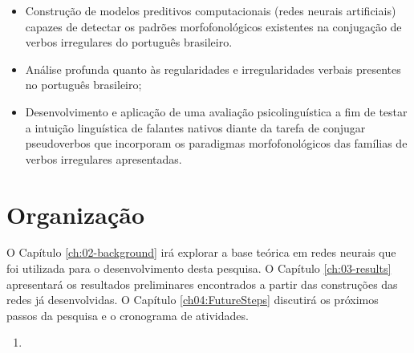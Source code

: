 \begin{itemize}
\item Construção de modelos preditivos computacionais (redes neurais artificiais) capazes de detectar os padrões morfofonológicos existentes na conjugação de verbos irregulares do português brasileiro.

\item Análise profunda quanto às regularidades e irregularidades verbais presentes no português brasileiro;

\item Desenvolvimento e aplicação de uma avaliação psicolinguística a fim de testar a intuição linguística de falantes nativos diante da tarefa de conjugar pseudoverbos que incorporam os paradigmas morfofonológicos das famílias de verbos irregulares apresentadas.

\end{itemize}

\section{Organização}
\label{sec:organization}

O Capítulo \ref{ch:02-background} irá explorar a base teórica em redes neurais que foi utilizada para o desenvolvimento desta pesquisa. O Capítulo \ref{ch:03-results} apresentará os resultados preliminares encontrados a partir das construções das redes já desenvolvidas. O Capítulo \ref{ch04:FutureSteps} discutirá os próximos passos da pesquisa e o cronograma de atividades.
\begin{enumerate}
\item 
\end{enumerate}
